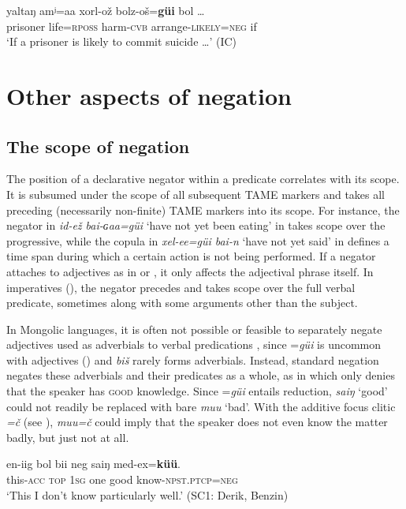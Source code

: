 \documentclass[output=paper,colorlinks,citecolor=brown,chinesefont]{langscibook}
\begin{document}
\ea\label{ex:kha:71}
    \gll yaltaŋ amʲ=aa xorl-ož bolz-oš=\textbf{güi} bol … \\ %
         prisoner life={\textsc{rposs}} harm-{\textsc{cvb}} arrange-{\textsc{likely=neg}} if  \\
    \glt ‘If a prisoner is likely to commit suicide …’ (IC)
\z 


\section{Other aspects of negation}\label{sec:kha:4}
\subsection{The scope of negation}\label{sec:kha:4.1}
 

The position of a declarative negator within a predicate correlates with its scope. It is subsumed under the scope of all subsequent TAME markers and takes all preceding (necessarily non-finite) TAME markers into its scope. For instance, the negator in \textit{id-ež bai-ɢaa=güi} ‘have not yet been eating’ in  takes scope over the progressive, while the copula in \textit{xel-ee=güi bai-n} ‘have not yet said’ in  defines a time span during which a certain action is not being performed. If a negator attaches to adjectives as in  or , it only affects the adjectival phrase itself. In imperatives (), the negator precedes and takes scope over the full verbal predicate, sometimes along with some arguments other than the subject.

In Mongolic languages, it is often not possible or feasible to separately negate adjectives used as adverbials to verbal predications \citep[156]{Yu1991}, since =\textit{güi} is uncommon with adjectives () and \textit{biš} rarely forms adverbials. Instead, standard negation negates these adverbials and their predicates as a whole, as in  which only denies that the speaker has \textsc{good} knowledge. Since =\textit{güi} entails reduction, \textit{saiŋ} ‘good’ could not readily be replaced with bare \textit{muu} ‘bad’. With the additive focus clitic \textit{=č} (see ), \textit{muu=č} could imply that the speaker does not even know the matter badly, but just not at all.

\ea\label{ex:kha:72}
    \gll en-iig bol bii neg saiŋ med-ex=\textbf{küü}. \\ 
         this-\textsc{acc} \textsc{top} \textsc{1sg} one good   know-\textsc{npst.ptcp=neg} \\
    \glt ‘This I don’t know particularly well.’ (SC1: Derik, Benzin)
\z 
\end{document}
